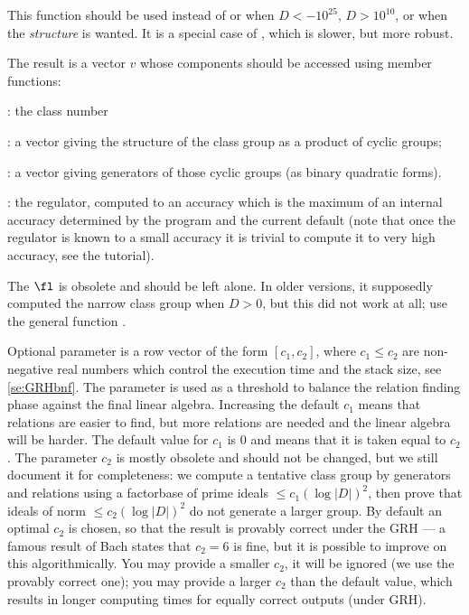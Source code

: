 This function should be used instead of  or 
when $D<-10^{25}$, $D>10^{10}$, or when the \emph{structure} is wanted. It
is a special case of , which is slower, but more robust.

The result is a vector $v$ whose components should be accessed using member
functions:

\item {}: the class number

\item {}: a vector giving the structure of the class group as a
product of cyclic groups;

\item {}: a vector giving generators of those cyclic groups (as
binary quadratic forms).

\item {}: the regulator, computed to an accuracy which is the
maximum of an internal accuracy determined by the program and the current
default (note that once the regulator is known to a small accuracy it is
trivial to compute it to very high accuracy, see the tutorial).

The $\fl$ is obsolete and should be left alone. In older versions,
it supposedly computed the narrow class group when $D>0$, but this did not
work at all; use the general function .

Optional parameter  is a row vector of the form $[c_1, c_2]$,
where $c_1 \leq c_2$ are non-negative real numbers which control the execution
time and the stack size, see \ref{se:GRHbnf}. The parameter is used as a
threshold to balance the relation finding phase against the final linear
algebra. Increasing the default $c_1$ means that relations are easier
to find, but more relations are needed and the linear algebra will be
harder. The default value for $c_1$ is $0$ and means that it is taken equal
to $c_2$. The parameter $c_2$ is mostly obsolete and should not be changed,
but we still document it for completeness: we compute a tentative class
group by generators and relations using a factorbase of prime ideals
$\leq c_1 (\log |D|)^2$, then prove that ideals of norm
$\leq c_2 (\log |D|)^2$ do
not generate a larger group. By default an optimal $c_2$ is chosen, so that
the result is provably correct under the GRH --- a famous result of Bach
states that $c_2 = 6$ is fine, but it is possible to improve on this
algorithmically. You may provide a smaller $c_2$, it will be ignored
(we use the provably correct
one); you may provide a larger $c_2$ than the default value, which results
in longer computing times for equally correct outputs (under GRH).

